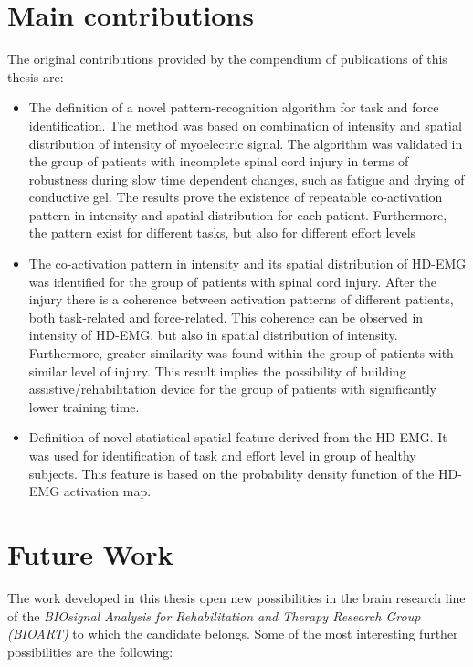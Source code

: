 \section{Main contributions}

The original contributions provided by the compendium of publications of this thesis are:

\begin{itemize}
\item The definition of a novel pattern-recognition algorithm for task and force identification. The method was based on combination of intensity and spatial distribution of intensity of myoelectric signal. The algorithm was validated in the group of patients with incomplete spinal cord injury in terms of robustness during slow time dependent changes, such as fatigue and drying of conductive gel. The results prove the existence of repeatable co-activation pattern in intensity and spatial distribution for each patient. Furthermore, the pattern exist for different tasks, but also for different effort levels

\item The co-activation pattern in intensity and its spatial distribution of HD-EMG was identified for the group of patients with spinal cord injury. After the injury there is a coherence between activation patterns of different patients, both task-related and force-related. This coherence can be observed in intensity of HD-EMG, but also in spatial distribution of intensity. Furthermore, greater similarity was found within the group of patients with similar level of injury. This result implies the possibility of building assistive/rehabilitation device for the group of patients with significantly lower training time.

\item Definition of novel statistical spatial feature derived from the HD-EMG. It was used for identification of task and effort level in group of healthy subjects. This feature is based on the probability density function of the HD-EMG activation map. 


\end{itemize}

\section{Future Work}
\label{sec:fw}
The work developed in this thesis open new possibilities in the brain research line of the \emph{BIOsignal Analysis for Rehabilitation and Therapy Research Group (BIOART)} to which the candidate belongs. Some of the most interesting further possibilities are the following: 

